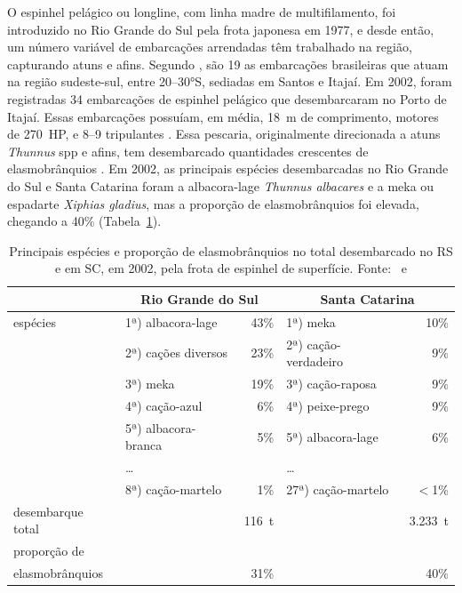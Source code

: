 \documentclass[a4paper,11pt,twoside,showtrims,onecolumn,openright,final]{memoir}
\begin{document}

O espinhel pelágico ou longline, com linha madre de multifilamento, foi 
introduzido no Rio Grande do Sul pela frota japonesa 
em 1977, e desde então, um número variável de embarcações arrendadas têm trabalhado na região, 
capturando atuns e afins. Segundo \citet{paiva1997}, são 19 as embarcações brasileiras que atuam na região
sudeste-sul, entre 20--30°S, sediadas em Santos e Itajaí. Em 2002, foram registradas 34 embarcações
de espinhel pelágico que desembarcaram no Porto de Itajaí. Essas embarcações possuíam, em média,
18~m de comprimento, motores de 270~HP, e 8--9 tripulantes \citep{univali2003}.
Essa pescaria, originalmente direcionada a atuns  \emph{Thunnus} spp e afins, 
tem desembarcado quantidades crescentes de elasmobrânquios \citep{kotas2004}.
Em 2002, as principais espécies desembarcadas no Rio Grande do Sul e Santa Catarina
foram a albacora-lage \emph{Thunnus albacares} e a meka 
ou espadarte \emph{Xiphias gladius}, mas a proporção de elasmobrânquios foi
elevada, chegando a 40\% (Tabela~\ref{tab:capturas-espinheldesuperficie}).


\begin{table}
\caption[Principais espécies e proporção de elasmobrânquios no total desembarcado no RS e em SC, em 2002,
	 pela frota de espinhel de superfície.]
	{Principais espécies e proporção de elasmobrânquios no total desembarcado no RS e em SC, em 2002,
	 pela frota de espinhel de superfície. Fonte: \citet{ceperg2003}\ e \citet{univali2003}}
\label{tab:capturas-espinheldesuperficie}
\begin{center}
\begin{tabular*}{\textwidth}{l@{\extracolsep{\fill}}lrlr}
\toprule
		& \multicolumn{2}{c}{Rio Grande do Sul} & \multicolumn{2}{c}{Santa Catarina} \\
\midrule
espécies 	& 1ª) albacora-lage	& 43\%	& 1ª) meka		  & 10\%	\\
		& 2ª) cações diversos	& 23\%	& 2ª) cação-verdadeiro	  & 9\%		\\
		& 3ª) meka		& 19\%	& 3ª) cação-raposa 	  & 9\%		\\
		& 4ª) cação-azul	& 6\%	& 4ª) peixe-prego 	  & 9\%		\\
		& 5ª) albacora-branca	& 5\%	& 5ª) albacora-lage	  & 6\%		\\
		& \ldots 		&	& \ldots 		  &		\\
		& 8ª) cação-martelo	& 1\%	& 27ª) cação-martelo  	  & $<$1\%	\\
\midrule
desembarque total & 			& 116~t& 			  & 3.233~t	\\
\midrule
proporção de	& 			&	& 			  & 		\\
elasmobrânquios	& 			& 31\%	& 			  & 40\%	\\
\bottomrule
\end{tabular*}
\end{center}
\end{table}
\end{document}
